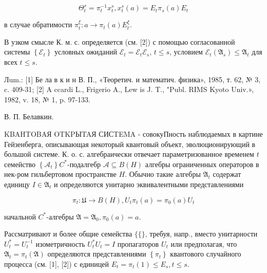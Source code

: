 \documentclass[10pt]{article}
\begin{document}
\[

\Theta_{t}^{s}=\pi_{t}^{-1} x_{t}^{s}, x_{t}^{s}(a)=E_{t} \pi_{s}(a) E_{t}

\]



в случае обратимости $\pi_{t}^{\xi}: a \rightarrow \pi_{t}(a) E_{t}^{\xi}$.



В узком смысле К. м. с. определяется (см. [2]) с помощью согласованной системы $\left\{\mathscr{E}_{t}\right\}$ условных ожиданий $\mathscr{E}_{t}=\mathscr{E}_{t} \mathscr{E}_{s}$, $t \leqslant s$, условием $\mathscr{E}_{t}\left(\mathfrak{A}_{s}\right) \leqslant \mathfrak{A}_{t}$ для всех $t \leqslant s$.



Лum.: [1] Бе ла в к и н В. П., «Теоретич. и математич. физика», 1985, т. 62, № 3, c. 409-31; [2] A ccardi L., Frigerio A., Lew is J. T., "Publ. RIMS Kyoto Univ.», 1982, v. 18, № 1, p. 97-133.



В. П. Белавкин.



KBAHTOBAЯ OTKPЫTAЯ СИСTEMA - совокуПность наблюдаемых в картине Гейзенберга, описывающая некоторый квантовый объект, эволюционирующий в большой системе. К. о. с. алгебраически отвечает параметризованное временем $t$ семейство $\left\{\mathfrak{\mathscr { A }}_{t}\right\} C^{*}$-подалгебр $\mathfrak{\mathscr { A }} \subseteq B(H)$ алгебры ограниченных операторов в нек-ром гильбертовом пространстве $H$. Обычно такие алгебры $\mathfrak{A}_{t}$ содержат единицу $I \in \mathfrak{A}_{t}$ и определяются унитарно эквивалентными представлениями



\[

\pi_{t}: \mathfrak{U} \rightarrow B(H), U_{t} \pi_{t}(a)=\pi_{0}(a) U_{t}

\]



начальной $C^{*}$-алгебры $\mathfrak{A}=\mathfrak{A}_{0}, \pi_{0}(a)=a$.



Рассматривают и более общие семейства $\{\mathfrak{\{}\}$, требуя, напр., вместо унитарности $U_{t}^{*}=U_{t}^{-1}$ изометричность $U_{t}^{*} U_{t}=I$ пропагаторов $U_{t}$ или предполагая, что $\mathfrak{A}_{t}=\pi_{t}(\mathfrak{A})$ определяются представлениями $\left\{\pi_{t}\right\}$ квантового случайного процесса (см. [1], [2]) с единицей $E_{t}=\pi_{t}(1) \leqslant E_{s}, t \leqslant s$.
\end{document}
